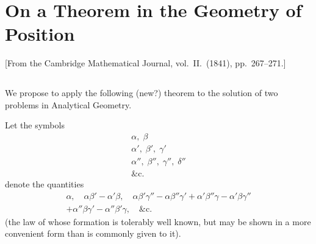 \documentclass[11pt,a4paper]{book}
\begin{document}
\cleardoublepage

\mainmatter

\chapter{On a Theorem in the Geometry of Position}
\label{chap:paper1}

\begin{center}
\small[From the Cambridge Mathematical Journal, vol.~II.\ (1841), pp.~267--271.]
\end{center}

\section*{}

We propose to apply the following (new?) theorem to the solution of two problems in Analytical Geometry.

Let the symbols
\[
\begin{array}{c}
\alpha, \; \beta \\
\alpha', \; \beta', \; \gamma' \\
\alpha'', \; \beta'', \; \gamma'', \; \delta'' \\
\&\mathrm{c.}
\end{array}
\]
denote the quantities
\begin{multline*}
\alpha, \quad \alpha\beta' - \alpha'\beta, \quad \alpha\beta'\gamma'' - \alpha\beta''\gamma' + \alpha'\beta''\gamma - \alpha'\beta\gamma'' \\
+ \alpha''\beta\gamma' - \alpha''\beta'\gamma, \quad \&\mathrm{c.}
\end{multline*}
(the law of whose formation is tolerably well known, but may be shown in a more convenient form than is commonly given to it).
\end{document}
